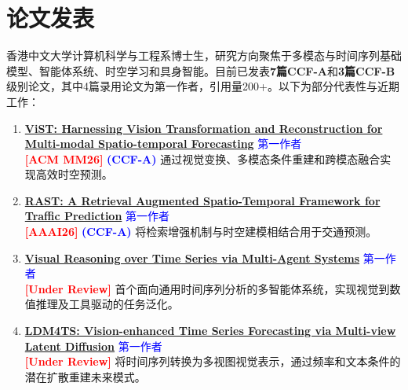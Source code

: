 \vspace{-8mm}
\section{论文发表}


香港中文大学计算机科学与工程系博士生，研究方向聚焦于多模态与时间序列基础模型、智能体系统、时空学习和具身智能。目前已发表\textbf{7篇CCF-A}和\textbf{3篇CCF-B}级别论文，其中4篇录用论文为第一作者，引用量200+。以下为部分代表性与近期工作：

\begin{enumerate}
\item \textbf{\href{https://openreview.net/forum?id=1WEyvT5Yvg}{ViST: Harnessing Vision Transformation and Reconstruction for Multi-modal Spatio-temporal Forecasting}}
\hfill \textcolor{blue}{第一作者} \\
\textbf{\textcolor{red}{[ACM MM26]}}
\textbf{\textcolor{blue}{(CCF-A)}}
通过视觉变换、多模态条件重建和跨模态融合实现高效时空预测。

\item \textbf{\href{https://arxiv.org/abs/2508.16623}{RAST: A Retrieval Augmented Spatio-Temporal Framework for Traffic Prediction}}
\hfill \textcolor{blue}{第一作者} \\
\textbf{\textcolor{red}{[AAAI26]}} 
\textbf{\textcolor{blue}{(CCF-A)}}
将检索增强机制与时空建模相结合用于交通预测。

\item \textbf{\href{https://arxiv.org/abs/2602.03026}{Visual Reasoning over Time Series via Multi-Agent Systems}}
\hfill \textcolor{blue}{第一作者} \\
\textbf{\textcolor{red}{[Under Review]}} 
首个面向通用时间序列分析的多智能体系统，实现视觉到数值推理及工具驱动的任务泛化。

\item \textbf{\href{https://arxiv.org/abs/2502.14887}{LDM4TS: Vision-enhanced Time Series Forecasting via Multi-view Latent Diffusion}}
\hfill \textcolor{blue}{第一作者} \\
\textbf{\textcolor{red}{[Under Review]}} 
将时间序列转换为多视图视觉表示，通过频率和文本条件的潜在扩散重建未来模式。


\end{enumerate}
